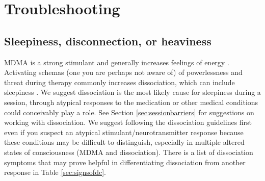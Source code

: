 \documentclass[12pt,letterpaper]{book}
\begin{document}
\section{Troubleshooting}
\label{sec:troubleshooting}
\subsection*{Sleepiness, disconnection, or heaviness}
MDMA is a strong stimulant and generally increases feelings of energy \cite{vizeliActuteEffects}. Activating schemas (one you are perhaps not aware of) of powerlessness and threat during therapy commonly increases dissociation, which can include sleepiness \cite{kozlowskaDefenseCascade}. We suggest dissociation is the most likely cause for sleepiness during a session, through atypical responses to the medication or other medical conditions could conceivably play a role. See Section \ref{sec:sessionbarriers} for suggestions on working with dissociation. We suggest following the dissociation guidelines first even if you suspect an atypical stimulant/neurotransmitter response because these conditions may be difficult to distinguish, especially in multiple altered states of consciousness (MDMA and dissociation). There is a list of dissociation symptoms that may prove helpful in differentiating dissociation from another response in Table \ref{sec:signsofdc}.
\end{document}
